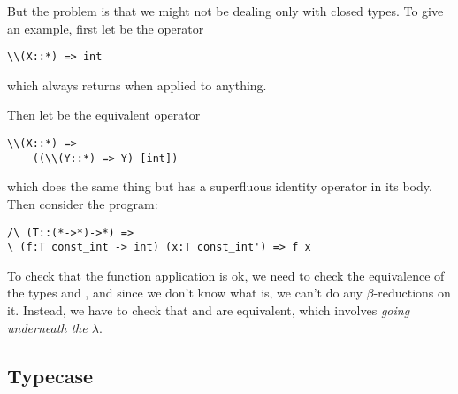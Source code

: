 \documentclass[pageno]{jpaper}
\begin{document}
{{{But the problem is that we might not be dealing only with closed types. To give an example, first let
 be the operator
\begin{lstlisting}
\\(X::*) => int
\end{lstlisting}

which always returns  when applied to anything.

Then let  be the equivalent operator
\begin{lstlisting}
\\(X::*) =>
    ((\\(Y::*) => Y) [int])
\end{lstlisting}

which does the same thing but has a superfluous identity operator in its body.
Then consider the program:
\begin{lstlisting}
/\ (T::(*->*)->*) =>
\ (f:T const_int -> int) (x:T const_int') => f x
\end{lstlisting}

To check that the function application  is ok, we need to check the equivalence of the types
 and , and since we don't know what  is, we can't do any
$\beta$-reductions on it. Instead, we have to check that  and  are equivalent,
which involves \textit{going underneath the $\lambda$}.

%

\subsection{Typecase}

}}}
\end{document}
